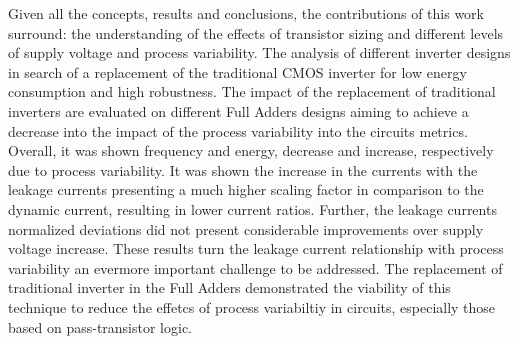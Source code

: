 \documentclass[diss,pgmicro,english]{iiufrgs}
\begin{document}
\begin{table}[]
\centering
\caption{Current results for the FAs considering the product between measures and deviations for dynamic and static currents.}
\label{tab:FACurr}
\end{table}

Given all the concepts, results and conclusions, the contributions of this work surround: the understanding of the effects of transistor sizing and different levels of supply voltage and process variability. The analysis of different inverter designs in search of a replacement of the traditional CMOS inverter for low energy consumption and high robustness. The impact of the replacement of traditional inverters are evaluated on different Full Adders designs aiming to achieve a decrease into the impact of the process variability into the circuits metrics. Overall, it was shown frequency and energy, decrease and increase, respectively due to process variability. It was shown the increase in the currents with the leakage currents presenting a much higher scaling factor in comparison to the dynamic current, resulting in lower current ratios. Further, the leakage currents normalized deviations did not present considerable improvements over supply voltage increase. These results turn the leakage current relationship with process variability an evermore important challenge to be addressed. The replacement of traditional inverter in the Full Adders demonstrated the viability of this technique to reduce the effetcs of process variabiltiy in circuits, especially those based on pass-transistor logic.
\end{document}
